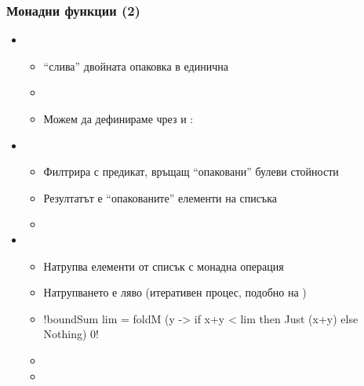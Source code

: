 \documentclass[alsotrans]{beamerswitch}
\begin{document}
\begin{frame}[fragile]
  \frametitle{Монадни функции (2)}
  \begin{fixedarea}
    \begin{itemize}[<+->]
    \item {}
      \begin{itemize}
      \item ``слива'' двойната опаковка в единична
      \item {}
      \item Можем да дефинираме \lst{(>>=)} чрез  и :  
      \end{itemize}
    \item {}
      \begin{itemize}
      \item Филтрира с предикат, връщащ ``опаковани'' булеви стойности
      \item Резултатът е ``опакованите'' елементи на списъка
      \item {}
      \end{itemize}
    \item {}
      \begin{itemize}
      \item Натрупва елементи от списък с монадна операция
      \item Натрупването е ляво (итеративен процес, подобно на )
      \item
        \lst!boundSum lim = foldM (\x y -> if x+y < lim then Just (x+y) else Nothing) 0!
      \item {}
      \item {}
      \end{itemize}
    \end{itemize}
  \end{fixedarea}
\end{frame}
\end{document}
